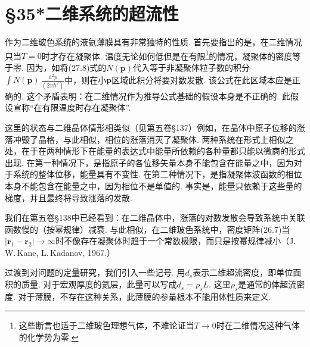 \section*{§35*\quad 二维系统的超流性}
{}


作为二维玻色系统的液氦薄膜具有非常独特的性质. 首先要指出的是，在二维情况只当$T=0$时才存在凝聚体. 温度无论如何低但是在有限\footnote{这些断言也适于二维玻色理想气体，不难论证当$T\to0$时在二维情况这种气体的化学势为零.}的情况，凝聚体的密度等于零. 因为，如将(27.8)式的$N(\bm{p})$代入等于非凝聚体粒子数的积分$\displaystyle\int N(\bm{p})\,\frac{\mathrm{d}^{2}p}{(2\pi\hbar^{2})}$中，则在小$\bm{p}$区域此积分将要对数发散. 该公式在此区域本应是正确的. 这个矛盾表明：在二维情况作为推导公式基础的假设本身是不正确的. 此假设宣称“在有限温度时存在凝聚体”.

这里的状态与二维晶体情形相类似（见第五卷§137）例如，在晶体中原子位移的涨落冲毁了晶格，与此相似，相位的涨落消灭了凝聚体. 两种系统在形式上相似之处，在于在两种情形下在能量的表达式中能量所依赖的各种量都只能以微商的形式出现. 在第一种情况下，是指原子的各位移矢量本身不能包含在能量之中，因为对于系统的整体位移，能量具有不变性. 在第二种情况下，是指凝聚体波函数的相位本身不能包含在能量之中，因为相位不是单值的. 事实是，能量只依赖于这些量的梯度，并且最终将导致涨落的发散.

我们在第五卷§138中已经看到：在二维晶体中，涨落的对数发散会导致系统中关联函数慢的（按幂规律）减衰. 与此相似，在二维玻色系统中，密度矩阵(26.7)当$|\bm{r}_{1}-\bm{r}_{2}|\to\infty$时不像存在凝聚体时趋于一个常数极限，而只是按幂规律减小（J.\,W.\,Kane, L.\,Kadanov, 1967.）

过渡到对问题的定量研究，我们引入一些记号. 用$d_{s}$表示二维超流密度，即单位面积的质量. 对于宏观厚度的氦层，此量可以写成$d_{s}=\rho_{s}L$. 这里$\rho_{s}$是通常的体超流密度. 对于薄膜，不存在这种关系，此薄膜的参量根本不能用体性质来定义.

